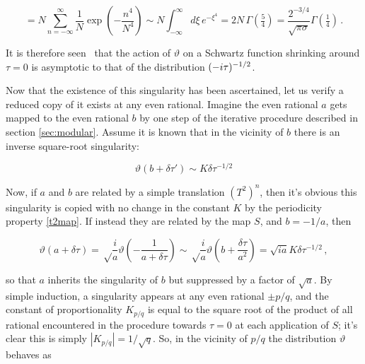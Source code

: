 \documentclass{article}
\newcommand{\intR}{\int_{-\infty}^\infty}
\newcommand{\sumZ}{\sum_{n=-\infty}^{\infty}}
\begin{document}
\begin{equation*}
    = N \sumZ \frac{1}{N} \exp(-\frac{n^4}{N^4}) \sim N \intR d\xi \, e^{-\xi^4} = 2 N \, \Gamma(\tfrac{5}{4}) = \frac{2^{-3/4}}{\sqrt{\pi\sigma}} \Gamma(\tfrac{1}{4})\,.
\end{equation*}

It is therefore seen%
\ that the action of $\vartheta$ on a Schwartz function shrinking around $\tau=0$ is asymptotic to that of the distribution $(-i\tau)^{-1/2}$.

Now that the existence of this singularity has been ascertained, let us verify a reduced copy of it exists at any even rational. Imagine the even rational $a$ gets mapped to the even rational $b$ by one step of the iterative procedure described in section \ref{sec:modular}. Assume it is known that in the vicinity of $b$ there is an inverse square-root singularity:

\begin{equation*}
    \vartheta(b + \delta\tau') \sim K \delta \tau^{-1/2}
\end{equation*}

Now, if $a$ and $b$ are related by a simple translation $(T^2)^n$, then it's obvious this singularity is copied with no change in the constant $K$ by the periodicity property \eqref{t2map}. If instead they are related by the map $S$, and $b = -1/a$, then

\begin{equation*}
    \vartheta(a + \delta\tau) = \sqrt\frac{i}{a} \vartheta\left(-\frac{1}{a+\delta\tau}\right) \sim \sqrt\frac{i}{a} \vartheta(b + \frac{\delta \tau}{a^2}) = \sqrt{ia} K \delta\tau^{-1/2}\,,
\end{equation*}

so that $a$ inherits the singularity of $b$ but suppressed by a factor of $\sqrt{a}$. By simple induction, a singularity appears at any even rational $\pm p/q$, and the constant of proportionality $K_{p/q}$ is equal to the square root of the product of all rational encountered in the procedure towards $\tau = 0$ at each application of $S$; it's clear this is simply $|K_{p/q}| = 1/\sqrt{q}$. So, in the vicinity of $p/q$ the distribution $\vartheta$ behaves as
\end{document}
